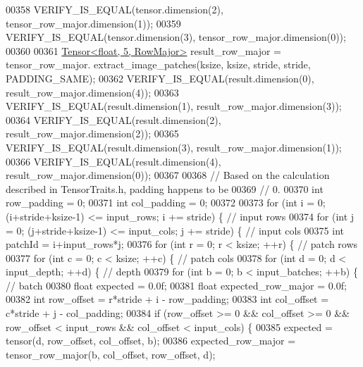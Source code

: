 \begin{DoxyCode}
00358   VERIFY\_IS\_EQUAL(tensor.dimension(2), tensor\_row\_major.dimension(1));
00359   VERIFY\_IS\_EQUAL(tensor.dimension(3), tensor\_row\_major.dimension(0));
00360 
00361   \hyperlink{class_eigen_1_1_tensor}{Tensor<float, 5, RowMajor>} result\_row\_major = tensor\_row\_major.
      extract\_image\_patches(ksize, ksize, stride, stride, PADDING\_SAME);
00362   VERIFY\_IS\_EQUAL(result.dimension(0), result\_row\_major.dimension(4));
00363   VERIFY\_IS\_EQUAL(result.dimension(1), result\_row\_major.dimension(3));
00364   VERIFY\_IS\_EQUAL(result.dimension(2), result\_row\_major.dimension(2));
00365   VERIFY\_IS\_EQUAL(result.dimension(3), result\_row\_major.dimension(1));
00366   VERIFY\_IS\_EQUAL(result.dimension(4), result\_row\_major.dimension(0));
00367 
00368   \textcolor{comment}{// Based on the calculation described in TensorTraits.h, padding happens to be}
00369   \textcolor{comment}{// 0.}
00370   \textcolor{keywordtype}{int} row\_padding = 0;
00371   \textcolor{keywordtype}{int} col\_padding = 0;
00372 
00373   \textcolor{keywordflow}{for} (\textcolor{keywordtype}{int} i = 0; (i+stride+ksize-1) <= input\_rows; i += stride) \{  \textcolor{comment}{// input rows}
00374     \textcolor{keywordflow}{for} (\textcolor{keywordtype}{int} j = 0; (j+stride+ksize-1) <= input\_cols; j += stride) \{  \textcolor{comment}{// input cols}
00375       \textcolor{keywordtype}{int} patchId = i+input\_rows*j;
00376       \textcolor{keywordflow}{for} (\textcolor{keywordtype}{int} r = 0; r < ksize; ++r) \{  \textcolor{comment}{// patch rows}
00377         \textcolor{keywordflow}{for} (\textcolor{keywordtype}{int} c = 0; c < ksize; ++c) \{  \textcolor{comment}{// patch cols}
00378           \textcolor{keywordflow}{for} (\textcolor{keywordtype}{int} d = 0; d < input\_depth; ++d) \{  \textcolor{comment}{// depth}
00379             \textcolor{keywordflow}{for} (\textcolor{keywordtype}{int} b = 0; b < input\_batches; ++b) \{  \textcolor{comment}{// batch}
00380               \textcolor{keywordtype}{float} expected = 0.0f;
00381               \textcolor{keywordtype}{float} expected\_row\_major = 0.0f;
00382               \textcolor{keywordtype}{int} row\_offset = r*stride + i - row\_padding;
00383               \textcolor{keywordtype}{int} col\_offset = c*stride + j - col\_padding;
00384               \textcolor{keywordflow}{if} (row\_offset >= 0 && col\_offset >= 0 && row\_offset < input\_rows && col\_offset < input\_cols)
       \{
00385                 expected = tensor(d, row\_offset, col\_offset, b);
00386                 expected\_row\_major = tensor\_row\_major(b, col\_offset, row\_offset, d);

\end{DoxyCode}
